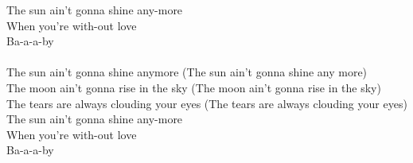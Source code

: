 The  sun ain't gonna shine any-more\\
When you're with-out love\\
 Ba-a-a-by\\
   \\
The  sun ain't gonna shine anymore (The sun ain't gonna shine any  more)\\
The  moon ain't gonna rise in the sky (The moon ain't gonna rise in the  sky)\\
The  tears are always clouding your eyes (The tears are always clouding your  eyes)\\
The  sun ain't gonna shine any-more\\
When you're with-out love\\
 Ba-a-a-by 
